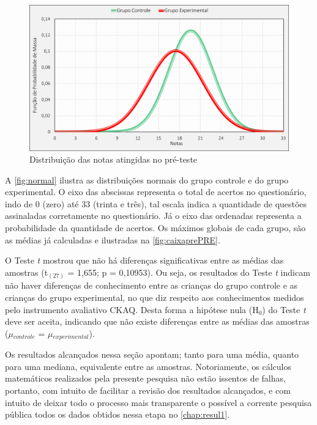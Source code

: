 \begin{figure}[htb]
    \centering
    \caption{\label{fig:normal}Distribuição das notas atingidas no pré-teste}
    \includegraphics[width=\linewidth]{./Visuais/Graficos1.pdf}
  
\end{figure}

A \autoref{fig:normal} ilustra as distribuições normais do grupo controle e do grupo experimental. O eixo das abscissas representa o total de acertos no questionário, indo de 0 (zero) até 33 (trinta e três), tal escala indica a quantidade de questões assinaladas corretamente no questionário. Já o eixo das ordenadas representa a probabilidade da quantidade de acertos. Os máximos globais de cada grupo, são as médias já calculadas e ilustradas na \autoref{fig:caixaprePRE}.

O Teste \textit{t} mostrou que não há diferenças significativas entre as médias das amostras (t$_{(27)}$ = 1,655; p = 0,10953). Ou seja, os resultados do Teste \textit{t} indicam não haver diferenças de conhecimento entre as crianças do grupo controle e as crianças do grupo experimental, no que diz respeito aos conhecimentos medidos pelo instrumento avaliativo \ac{CKAQ}. Desta forma a hipótese nula (H$_0$) do Teste \textit{t} deve ser aceita, indicando que não existe diferenças entre as médias das amostras ($\mu$$_{controle}$ = $\mu$$_{experimental}$). 

Os resultados alcançados nessa seção apontam; tanto para uma média, quanto para uma mediana, equivalente entre as amostras. Notoriamente, os cálculos matemáticos realizados pela presente pesquisa não estão issentos de falhas, portanto, com intuito de facilitar a revisão dos resultados alcançados, e com intuito de deixar todo o processo mais transparente o possível a corrente pesquisa pública todos os dados obtidos nessa etapa no \autoref{chap:resul1}.

